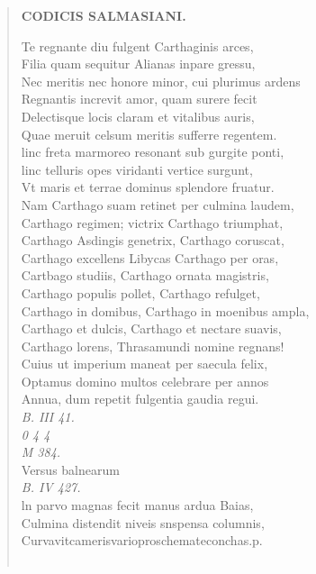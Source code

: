 \documentclass[11pt, a4paper]{report}
\begin{document}
\begin{verse}
     \marginpar{[289]} \begin{center} \textbf{CODICIS SALMASIANI.} \end{center}Te regnante diu fulgent Carthaginis arces, \\ Filia quam sequitur Alianas inpare gressu, \\ Nec meritis nec honore minor, cui plurimus ardens \\ Regnantis increvit amor, quam surere fecit \\ Delectisque locis claram  \lbrack et vitalibus auris, \\ Quae meruit celsum meritis sufferre regentem. \\ linc freta marmoreo resonant sub gurgite ponti, \\ linc telluris opes viridanti vertice surgunt, \\ Vt maris et terrae dominus splendore fruatur. \\ Nam Carthago suam retinet per culmina laudem, \\ Carthago regimen; victrix Carthago triumphat, \\ Carthago Asdingis genetrix, Carthago coruscat, \\ Carthago excellens Libycas Carthago per oras, \\ Cartbago studiis, Carthago ornata magistris, \\ Carthago populis pollet, Carthago refulget, \\ Carthago in domibus, Carthago in moenibus ampla, \\ Carthago et dulcis, Carthago et nectare suavis, \\ Carthago lorens, Thrasamundi nomine regnans! \\ Cuius ut imperium maneat per saecula felix, \\ Optamus domino multos celebrare per annos \\ Annua, dum repetit fulgentia gaudia regui. \\ \textit{B. III 41.} \\ \textit{0 4 4} \\ \textit{M 384.} \\ Versus balnearum \\ \textit{B. IV 427.} \\ ln parvo magnas fecit manus ardua Baias, \\ Culmina distendit niveis snspensa columnis, \\ Curvavitcamerisvarioproschemateconchas.p. \\ 
        ﻿\pagebreak 

\end{verse}
\end{document}
